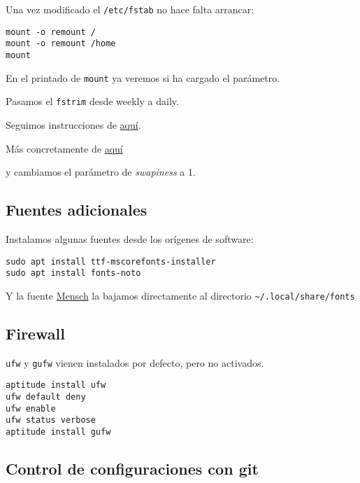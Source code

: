 \documentclass[
  12pt,
  spanish,
]{article}
\begin{document}
Una vez modificado el \texttt{/etc/fstab} no hace falta arrancar:

\begin{verbatim}
mount -o remount /
mount -o remount /home
mount
\end{verbatim}

En el printado de \texttt{mount} ya veremos si ha cargado el parámetro.

Pasamos el \texttt{fstrim} desde weekly a daily.

Seguimos instrucciones de
\href{https://easylinuxtipsproject.blogspot.com/p/ssd.html}{aquí}.

Más concretamente de
\href{https://easylinuxtipsproject.blogspot.com/p/ssd.html\#ID8.2}{aquí}

y cambiamos el parámetro de \emph{swapiness} a 1.

\hypertarget{fuentes-adicionales}{%
\subsection{Fuentes adicionales}\label{fuentes-adicionales}}

Instalamos algunas fuentes desde los orígenes de software:

\begin{verbatim}
sudo apt install ttf-mscorefonts-installer
sudo apt install fonts-noto
\end{verbatim}

Y la fuente
\href{https://robey.lag.net/2010/06/21/mensch-font.html}{Mensch} la
bajamos directamente al directorio
\texttt{\textasciitilde{}/.local/share/fonts}

\hypertarget{firewall}{%
\subsection{Firewall}\label{firewall}}

\texttt{ufw} y \texttt{gufw} vienen instalados por defecto, pero no
activados.

\begin{verbatim}
aptitude install ufw
ufw default deny
ufw enable
ufw status verbose
aptitude install gufw
\end{verbatim}

\hypertarget{control-de-configuraciones-con-git}{%
\subsection{Control de configuraciones con
git}\label{control-de-configuraciones-con-git}}
\end{document}

